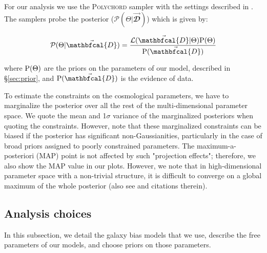 \documentclass[aps, prd,twocolumn,superscriptaddress,nofootinbib,preprintnumbers]{revtex4-1}
\begin{document}
For our analysis we use the \textsc{Polychord} sampler with the settings described in \cite{y3-samplers}. The samplers probe the posterior ($\mathcal{P}(\Theta | \vec{\mathbfcal{D}})$) which is given by:
\begin{linenomath*}
\begin{equation}
    \mathcal{P}(\Theta | \vec{\mathbfcal{D}}) = \frac{\mathcal{L}(\vec{\mathbfcal{D}}|\Theta) {\rm P}(\Theta)}{{\rm P}(\vec{\mathbfcal{D}})}
\end{equation}
\end{linenomath*}
where ${\rm P}(\Theta)$ are the priors on the parameters of our model, described in \S\ref{sec:prior}, and ${\rm P}(\vec{\mathbfcal{D}})$ is the evidence of data. 

To estimate the constraints on the cosmological parameters, we have to marginalize the posterior over all the rest of the multi-dimensional parameter space. We quote the mean and 1$\sigma$ variance of the marginalized posteriors when quoting the constraints. However, note that these marginalized constraints can be biased if the posterior has significant non-Gaussianities, particularly in the case of broad priors assigned to poorly constrained parameters. The maximum-a-posteriori (MAP) point is not affected by such "projection effects"; therefore, we also show the MAP value in our plots. However, we note that in high-dimensional parameter space with a non-trivial structure, it is difficult to converge on a global maximum of the whole posterior (also see \citet{Joachimi_2021} and citations therein).


\subsection{Analysis choices}
\label{sec:analysis_choices}
In this subsection, we detail the galaxy bias models that we use, describe the free parameters of our models, and choose priors on those parameters. 
\end{document}
